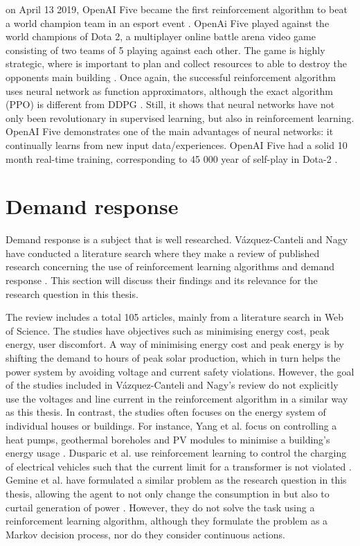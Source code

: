 \documentclass[class=book, crop=false]{standalone}
\begin{document}
on April 13 2019, OpenAI Five became the first reinforcement algorithm to beat a world champion team in an esport event \cite{openai_dota}. OpenAi Five played against the world champions of Dota 2, a multiplayer online battle arena video game consisting of two teams of 5 playing against each other. The game is highly strategic, where is important to plan and collect resources to able to destroy the opponents main building \cite{dota_wiki}. Once again, the successful reinforcement algorithm uses neural network as function approximators, although the exact algorithm (PPO) is different from DDPG \cite{PPO_openAI_Schulman}. Still, it shows that neural networks have not only been revolutionary in supervised learning, but also in reinforcement learning. OpenAI Five demonstrates one of the main advantages of neural networks: it continually learns from new input data/experiences. OpenAI Five had a solid 10 month real-time training, corresponding to 45 000 year of self-play in Dota-2 \cite{openai_dota}.


\section{Demand response}
Demand response is a subject that is well researched. Vázquez-Canteli and Nagy have conducted a literature search where they make a review of published research concerning the use of reinforcement learning algorithms and demand response \cite{vazquez2019reinforcement}. This section will discuss their findings and its relevance for the research question in this thesis.

The review includes a total 105 articles, mainly from a literature search in Web of Science. The studies have objectives such as minimising energy cost, peak energy, user discomfort. A way of minimising energy cost and peak energy is by shifting the demand to hours of peak solar production, which in turn helps the power system by avoiding voltage and current safety violations. However, the goal of the studies included in Vázquez-Canteli and Nagy's review do not explicitly use the voltages and line current in the reinforcement algorithm in a similar way as this thesis. In contrast, the studies often focuses on the energy system of individual houses or buildings. For instance,  Yang et al. focus on controlling a heat pumps, geothermal boreholes and PV modules to minimise a building's energy usage \cite{yang2015reinforcement}.  Dusparic et al. use reinforcement learning to control the charging of electrical vehicles such that the current limit for a transformer is not violated \cite{dusparic2013multi}. Gemine et al. have formulated a similar problem as the research question in this thesis, allowing the agent to not only change the consumption in but also to curtail generation of power \cite{active_network_management}. However, they do not solve the task using a reinforcement learning algorithm, although they formulate the problem as a Markov decision process, nor do they consider continuous actions. 
\end{document}
